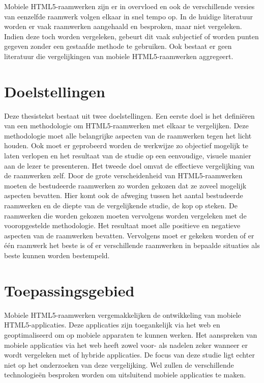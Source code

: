 Mobiele HTML5-raamwerken zijn er in overvloed en ook de verschillende versies van eenzelfde raamwerk volgen elkaar in snel tempo op.
In de huidige literatuur worden er vaak raamwerken aangehaald en besproken, maar niet vergeleken.
Indien deze toch worden vergeleken, gebeurt dit vaak subjectief of worden punten gegeven zonder een gestaafde methode te gebruiken.
Ook bestaat er geen literatuur die vergelijkingen van mobiele HTML5-raamwerken aggregeert.

\section{Doelstellingen}

Deze thesistekst bestaat uit twee doelstellingen.
Een eerste doel is het definiëren van een methodologie om HTML5-raamwerken met elkaar te vergelijken.
Deze methodologie moet alle belangrijke aspecten van de raamwerken tegen het licht houden.
Ook moet er geprobeerd worden de werkwijze zo objectief mogelijk te laten verlopen en het resultaat van de studie op een eenvoudige,  visuele manier aan de lezer te presenteren.
Het tweede doel omvat de effectieve vergelijking van de raamwerken zelf.
Door de grote verscheidenheid van HTML5-raamwerken moeten de bestudeerde raamwerken zo worden gekozen dat ze zoveel mogelijk aspecten bevatten.
Hier komt ook de afweging tussen het aantal bestudeerde raamwerken en de diepte van de vergelijkende studie, de kop op steken.
De raamwerken die worden gekozen moeten vervolgens worden vergeleken met de vooropgestelde methodologie.
Het resultaat moet alle positieve en negatieve aspecten van de raamwerken bevatten.
Vervolgens moet er gekeken worden of er één raamwerk het beste is of er verschillende raamwerken in bepaalde situaties als beste kunnen worden bestempeld.

\section{Toepassingsgebied}

Mobiele HTML5-raamwerken vergemakkelijken de ontwikkeling van mobiele HTML5-applicaties.
Deze applicaties zijn toegankelijk via het web en geoptimaliseerd om op mobiele apparaten te kunnen werken.
Het aanspreken van mobiele applicaties via het web heeft zowel voor- als nadelen zeker wanneer er wordt vergeleken met  of hybride applicaties.
De focus van deze studie ligt echter niet op het onderzoeken van deze vergelijking.
Wel zullen de verschillende technologieën besproken worden om uitsluitend mobiele applicaties te maken.

